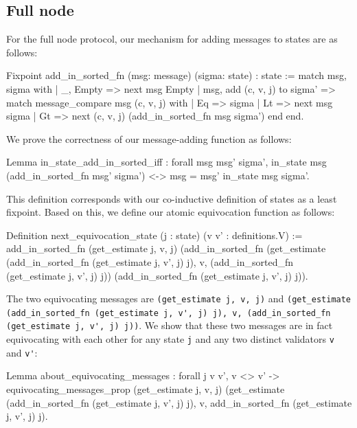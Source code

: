 \documentclass[runningheads]{llncs}
\begin{document}
\subsection{Full node}
For the full node protocol, our mechanism for adding messages to states are as follows:
\begin{coq}
Fixpoint add_in_sorted_fn (msg: message) (sigma: state) : state :=
	match msg, sigma with
	| _, Empty => next msg Empty
	| msg, add (c, v, j) to sigma' =>
	match message_compare msg (c, v, j) with
	| Eq => sigma
	| Lt => next msg sigma
	| Gt => next (c, v, j) (add_in_sorted_fn msg sigma')
	end
	end.
\end{coq}
We prove the correctness of our message-adding function as follows:
\begin{coq}
Lemma in_state_add_in_sorted_iff : forall msg msg' sigma',
	in_state msg (add_in_sorted_fn msg' sigma') <->
	msg = msg' \/ in_state msg sigma'.
\end{coq}
This definition corresponds with our co-inductive definition of states as a least fixpoint. Based on this, we define our atomic equivocation function as follows:
\begin{coq}
Definition next_equivocation_state (j : state) (v v' : definitions.V) :=
	add_in_sorted_fn
	(get_estimate j, v, j)
	(add_in_sorted_fn
	(get_estimate (add_in_sorted_fn (get_estimate j, v', j) j), v,
	(add_in_sorted_fn (get_estimate j, v', j) j))
	(add_in_sorted_fn (get_estimate j, v', j) j)).	
\end{coq}
The two equivocating messages are \verb|(get_estimate j, v, j)| and \verb|(get_estimate| \\ \verb|(add_in_sorted_fn (get_estimate j, v', j) j), v, (add_in_sorted_fn| \\ \verb|(get_estimate j, v', j) j))|. We show that these two messages are in fact equivocating with each other for any state \verb|j| and any two distinct validators \verb|v| and \verb|v'|:
\begin{coq}
Lemma about_equivocating_messages :
	forall j v v',
	v <> v' -> 
	equivocating_messages_prop (get_estimate j, v, j)
	(get_estimate (add_in_sorted_fn (get_estimate j, v', j) j), v,
	add_in_sorted_fn (get_estimate j, v', j) j).
\end{coq}
\end{document}
